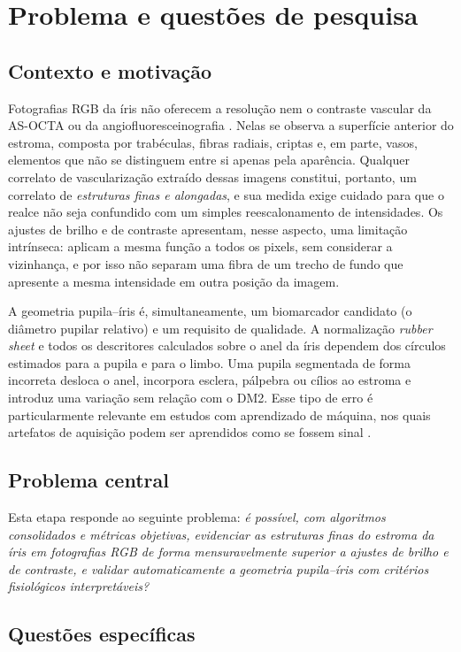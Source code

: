 \documentclass[12pt, oneside, a4paper, chapter=TITLE, section=TITLE,
               english, brazil]{abntex2}
\newcommand{\secao}[1]{\section[\texorpdfstring{\protect\MakeTextUppercase{#1}}{#1}]{#1}}
\begin{document}
\chapter{Problema e questões de pesquisa}
\label{cap:problema}

\secao{Contexto e motivação}

Fotografias RGB da íris não oferecem a resolução nem o contraste vascular da
AS-OCTA ou da angiofluoresceinografia \citep*{Zett2018}. Nelas se observa a
superfície anterior do estroma, composta por trabéculas, fibras radiais,
criptas e, em parte, vasos, elementos que não se distinguem entre si apenas
pela aparência. Qualquer correlato de vascularização extraído dessas imagens
constitui, portanto, um correlato de \emph{estruturas finas e alongadas}, e sua
medida exige cuidado para que o realce não seja confundido com um simples
reescalonamento de intensidades. Os ajustes de brilho e de contraste
apresentam, nesse aspecto, uma limitação intrínseca: aplicam a mesma função a
todos os pixels, sem considerar a vizinhança, e por isso não separam uma
fibra de um trecho de fundo que apresente a mesma intensidade em outra
posição da imagem.

A geometria pupila--íris é, simultaneamente, um biomarcador candidato (o
diâmetro pupilar relativo) e um requisito de qualidade. A normalização
\emph{rubber sheet} \citep*{Daugman2004} e todos os descritores calculados
sobre o anel da íris dependem dos círculos estimados para a pupila e para o
limbo. Uma pupila segmentada de forma incorreta desloca o anel, incorpora
esclera, pálpebra ou cílios ao estroma e introduz uma variação sem relação
com o DM2. Esse tipo de erro é particularmente relevante em estudos com
aprendizado de máquina, nos quais artefatos de aquisição podem ser aprendidos
como se fossem sinal \citep*{Zech2018}.

\secao{Problema central}

Esta etapa responde ao seguinte problema: \emph{é possível, com algoritmos
consolidados e métricas objetivas, evidenciar as estruturas finas do estroma
da íris em fotografias RGB de forma mensuravelmente superior a ajustes de
brilho e de contraste, e validar automaticamente a geometria pupila--íris com
critérios fisiológicos interpretáveis?}

\secao{Questões específicas}
\end{document}
